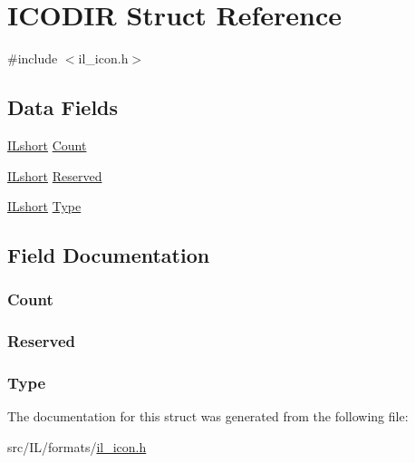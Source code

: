 \hypertarget{struct_i_c_o_d_i_r}{\section{I\-C\-O\-D\-I\-R Struct Reference}
\label{struct_i_c_o_d_i_r}
}


{\ttfamily \#include $<$il\-\_\-icon.\-h$>$}

\subsection*{Data Fields}
\begin{DoxyCompactItemize}
\item 
\hyperlink{il_8h_afc75ded918970afe7517d3f7f0561db3}{I\-Lshort} \hyperlink{struct_i_c_o_d_i_r_af20ba04ee6e5db353c99daadae24b9c7}{Count}
\item 
\hyperlink{il_8h_afc75ded918970afe7517d3f7f0561db3}{I\-Lshort} \hyperlink{struct_i_c_o_d_i_r_aac285f5f5ddcd675fc0c4bbf3220bf93}{Reserved}
\item 
\hyperlink{il_8h_afc75ded918970afe7517d3f7f0561db3}{I\-Lshort} \hyperlink{struct_i_c_o_d_i_r_a4e7dcf3ac8bee66dd5a6273b3c0fae91}{Type}
\end{DoxyCompactItemize}


\subsection{Field Documentation}
\hypertarget{struct_i_c_o_d_i_r_af20ba04ee6e5db353c99daadae24b9c7}{
\subsubsection[{Count}]{ Count}}\label{struct_i_c_o_d_i_r_af20ba04ee6e5db353c99daadae24b9c7}
\hypertarget{struct_i_c_o_d_i_r_aac285f5f5ddcd675fc0c4bbf3220bf93}{
\subsubsection[{Reserved}]{ Reserved}}\label{struct_i_c_o_d_i_r_aac285f5f5ddcd675fc0c4bbf3220bf93}
\hypertarget{struct_i_c_o_d_i_r_a4e7dcf3ac8bee66dd5a6273b3c0fae91}{
\subsubsection[{Type}]{ Type}}\label{struct_i_c_o_d_i_r_a4e7dcf3ac8bee66dd5a6273b3c0fae91}


The documentation for this struct was generated from the following file\-:\begin{DoxyCompactItemize}
\item 
src/\-I\-L/formats/\hyperlink{il__icon_8h}{il\-\_\-icon.\-h}\end{DoxyCompactItemize}
